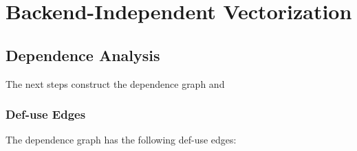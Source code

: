 
\section{Backend-Independent Vectorization}
\label{sec:vectorization}


\subsection{Dependence Analysis}
\label{sec:dependence}

The next steps construct the dependence graph and 

\subsubsection{Def-use Edges}

The dependence graph has the following def-use edges:

